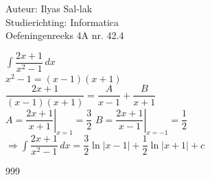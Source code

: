 \documentclass[a4paper]{article}
\newcommand{\dint}{\displaystyle\int}
\begin{document}
\noindent \large Auteur: Ilyas Sal-lak \\
\noindent \large Studierichting: Informatica\\
\noindent \large Oefeningenreeks 4A nr. 42.4\\
\medskip
\normalsize

$\dint \dfrac{2x+1}{x^2-1} \, dx$ \\

$x^2 - 1 = (x-1)(x+1)$ \\

$\dfrac{2x+1}{(x-1)(x+1)} = \dfrac{A}{x-1} + \dfrac{B}{x+1}$ \\

$A = \left.\dfrac{2x+1}{x+1}\right|_{x=1} = \dfrac{3}{2}$ \quad $B = \left.\dfrac{2x+1}{x-1}\right|_{x=-1} = \dfrac{1}{2}$ \\

$\Rightarrow \dint \dfrac{2x+1}{x^2-1} \, dx = \dfrac{3}{2}\ln|x-1| + \dfrac{1}{2}\ln|x+1| + c$

\begin{thebibliography}{999}
\end{thebibliography}
\end{document}
